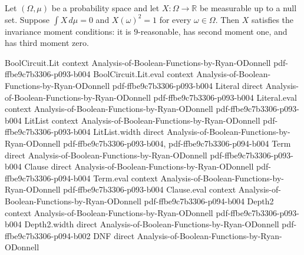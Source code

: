 \begin{lemma}
\leanok
{}
Let $(\Omega,\mu)$ be a probability space and let $X\colon\Omega\to\mathbb R$ be
measurable up to a null set. Suppose $\int X\,d\mu=0$ and $X(\omega)^2=1$ for every
$\omega\in\Omega$. Then $X$ satisfies the invariance moment conditions: it is
$9$-reasonable, has second moment one, and has third moment zero.
\end{lemma}

\begin{lemma}
\leanok
{}
\proofstep
  {BoolCircuit.Lit}
  {context}
  {Analysis-of-Boolean-Functions-by-Ryan-ODonnell}
  {pdf-ffbe9c7b3306-p093-b004}
\proofstep
  {BoolCircuit.Lit.eval}
  {context}
  {Analysis-of-Boolean-Functions-by-Ryan-ODonnell}
  {pdf-ffbe9c7b3306-p093-b004}
\proofstep
  {Literal}
  {direct}
  {Analysis-of-Boolean-Functions-by-Ryan-ODonnell}
  {pdf-ffbe9c7b3306-p093-b004}
\proofstep
  {Literal.eval}
  {context}
  {Analysis-of-Boolean-Functions-by-Ryan-ODonnell}
  {pdf-ffbe9c7b3306-p093-b004}
\proofstep
  {LitList}
  {context}
  {Analysis-of-Boolean-Functions-by-Ryan-ODonnell}
  {pdf-ffbe9c7b3306-p093-b004}
\proofstep
  {LitList.width}
  {direct}
  {Analysis-of-Boolean-Functions-by-Ryan-ODonnell}
  {pdf-ffbe9c7b3306-p093-b004,
    pdf-ffbe9c7b3306-p094-b004}
\proofstep
  {Term}
  {direct}
  {Analysis-of-Boolean-Functions-by-Ryan-ODonnell}
  {pdf-ffbe9c7b3306-p093-b004}
\proofstep
  {Clause}
  {direct}
  {Analysis-of-Boolean-Functions-by-Ryan-ODonnell}
  {pdf-ffbe9c7b3306-p094-b004}
\proofstep
  {Term.eval}
  {context}
  {Analysis-of-Boolean-Functions-by-Ryan-ODonnell}
  {pdf-ffbe9c7b3306-p093-b004}
\proofstep
  {Clause.eval}
  {context}
  {Analysis-of-Boolean-Functions-by-Ryan-ODonnell}
  {pdf-ffbe9c7b3306-p094-b004}
\proofstep
  {Depth2}
  {context}
  {Analysis-of-Boolean-Functions-by-Ryan-ODonnell}
  {pdf-ffbe9c7b3306-p093-b004}
\proofstep
  {Depth2.width}
  {direct}
  {Analysis-of-Boolean-Functions-by-Ryan-ODonnell}
  {pdf-ffbe9c7b3306-p094-b002}
\proofstep
  {DNF}
  {direct}
  {Analysis-of-Boolean-Functions-by-Ryan-ODonnell}

\end{lemma}
